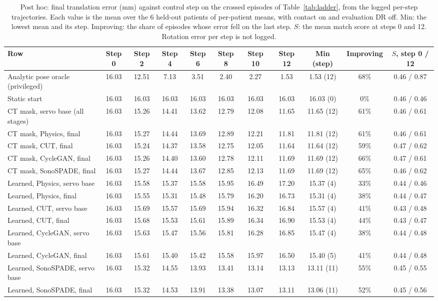 
\begin{table}[t]
\caption{Post hoc: final translation error (mm) against control step on the crossed episodes of Table~\ref{tab:ladder}, from the logged per-step trajectories. Each value is the mean over the 6 held-out patients of per-patient means, with contact on and evaluation DR off. Min: the lowest mean and its step. Improving: the share of episodes whose error fell on the last step. $S$: the mean match score at steps 0 and 12. Rotation error per step is not logged.}
\label{tab:step-error}
\centering
\renewcommand{\baselinestretch}{1}\footnotesize
\setlength{\tabcolsep}{4pt}
\begin{tabular}{@{}l ccccccc ccc@{}}
\toprule
Row & Step 0 & Step 2 & Step 4 & Step 6 & Step 8 & Step 10 & Step 12 & Min (step) & Improving & $S$, step 0 / 12 \\
\midrule
Analytic pose oracle (privileged) & 16.03 & 12.51 & 7.13 & 3.51 & 2.40 & 2.27 & 1.53 & 1.53 (12) & 68\% & 0.46 / 0.87 \\
Static start & 16.03 & 16.03 & 16.03 & 16.03 & 16.03 & 16.03 & 16.03 & 16.03 (0) & 0\% & 0.46 / 0.46 \\
CT mask, servo base (all stages) & 16.03 & 15.26 & 14.41 & 13.62 & 12.79 & 12.08 & 11.65 & 11.65 (12) & 61\% & 0.46 / 0.61 \\
CT mask, Physics, final & 16.03 & 15.27 & 14.44 & 13.69 & 12.89 & 12.21 & 11.81 & 11.81 (12) & 61\% & 0.46 / 0.61 \\
CT mask, CUT, final & 16.03 & 15.24 & 14.37 & 13.58 & 12.75 & 12.05 & 11.64 & 11.64 (12) & 59\% & 0.47 / 0.62 \\
CT mask, CycleGAN, final & 16.03 & 15.26 & 14.40 & 13.60 & 12.78 & 12.11 & 11.69 & 11.69 (12) & 66\% & 0.47 / 0.61 \\
CT mask, SonoSPADE, final & 16.03 & 15.27 & 14.44 & 13.67 & 12.85 & 12.13 & 11.69 & 11.69 (12) & 65\% & 0.46 / 0.62 \\
Learned, Physics, servo base & 16.03 & 15.58 & 15.37 & 15.58 & 15.95 & 16.49 & 17.20 & 15.37 (4) & 33\% & 0.44 / 0.46 \\
Learned, Physics, final & 16.03 & 15.55 & 15.31 & 15.48 & 15.79 & 16.20 & 16.73 & 15.31 (4) & 38\% & 0.44 / 0.47 \\
Learned, CUT, servo base & 16.03 & 15.69 & 15.57 & 15.69 & 15.94 & 16.32 & 16.84 & 15.57 (4) & 41\% & 0.43 / 0.48 \\
Learned, CUT, final & 16.03 & 15.68 & 15.53 & 15.61 & 15.89 & 16.34 & 16.90 & 15.53 (4) & 44\% & 0.43 / 0.47 \\
Learned, CycleGAN, servo base & 16.03 & 15.63 & 15.47 & 15.56 & 15.81 & 16.28 & 16.85 & 15.47 (4) & 38\% & 0.44 / 0.48 \\
Learned, CycleGAN, final & 16.03 & 15.61 & 15.40 & 15.42 & 15.58 & 15.97 & 16.50 & 15.40 (5) & 41\% & 0.44 / 0.48 \\
Learned, SonoSPADE, servo base & 16.03 & 15.32 & 14.55 & 13.93 & 13.41 & 13.14 & 13.13 & 13.11 (11) & 55\% & 0.45 / 0.55 \\
Learned, SonoSPADE, final & 16.03 & 15.32 & 14.53 & 13.91 & 13.38 & 13.07 & 13.11 & 13.06 (11) & 52\% & 0.45 / 0.56 \\
\bottomrule
\end{tabular}
\end{table}
